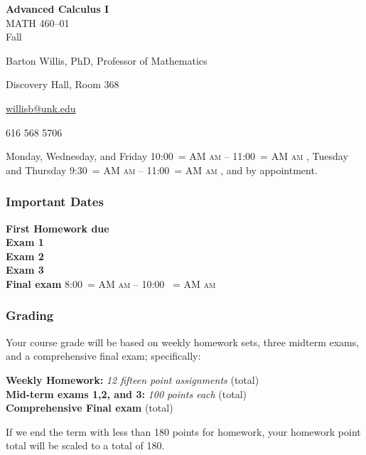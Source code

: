\documentclass[12pt]{article}
\makeatletter
\newcounter{ex}\setcounter{ex}{0}
\newenvironment{mypar}[2]
  {\begin{list}{}%
    {\setlength\leftmargin{#1}
    \setlength\rightmargin{#2}}
    \item[]}
  {\end{list}}
\renewenvironment{description}[0]{\begin{compactdesc}}{\end{compactdesc}}
\DeclareRobustCommand{\maybefakesc}[1]{%
  \ifnum\pdfstrcmp{\f@series}{\bfdefault}=\z@
    {\fontsize{\dimexpr0.8\dimexpr\f@size pt\relax}{0}\selectfont\uppercase{#1}}%
  \else
    \textsc{#1}%
  \fi
}
\newcommand\AM{\,\maybefakesc{am}\xspace}
\newcommand{\coursename}{Advanced Calculus I}
\newcommand{\coursenumber}{MATH 460}
\newcommand{\sectionnumber}{01}
\newcommand{\term}{Fall }
\newcommand{\officehours}{ Monday, Wednesday, and Friday 10:00\AM -- 11:00\AM,
    Tuesday and Thursday 9:30\AM -- 11:00\AM, and by appointment.}
\newcommand{\finaldateandtime}{\printdate{14/12/\the\year} 8:00\AM{} -- 10:00 \AM}
\makeatother
\begin{document}
\cleanlookdateon%
\shortdate
\printyearoff
\large
\begin{center}
    \textbf{\coursename}  \\
    {\coursenumber--\sectionnumber} \\
     {\term \the\year} \\
\end{center}

\vskip0.25in
\normalsize


\begin{center}
\begin{description}
    \item[Instructor:] Barton Willis, PhD, Professor of Mathematics
    \item[Office:]  Discovery Hall, Room 368
    \item[\phone:]   
    \item[\Email:]    \href{mailto:willisb@unk.edu}{willisb@unk.edu}
    \item[Zoom:] 616 568 5706
    \item[Office Hours:] \officehours
  \end{description}
\end{center}



\subsubsection*{Important Dates}

\begin{mypar}{0.25in}{0.25in} 

      \textbf{First Homework due} \dotfill  {}  \\
       \textbf{Exam 1} \dotfill {}  \\
    \textbf{Exam 2} \dotfill  {} \\
    \textbf{Exam 3} \dotfill {} \\
      \textbf{Final exam} \dotfill  \finaldateandtime
\end{mypar}



\subsubsection*{Grading}

Your course grade will be based on weekly homework sets, three midterm exams, and a comprehensive 
final exam; specifically:
\begin{mypar}{0.25in}{0.25in}
    \textbf{Weekly Homework:}  \emph{12 fifteen point assignments}   (total) \\
    \textbf{Mid-term exams 1,2, and 3:} \emph{100 points each}  (total)\\
      \textbf{Comprehensive Final exam}  (total)
\end{mypar}
If we end the term with less than 180 points for homework,  your homework point total will be scaled to a total of 180. 
\end{document}
